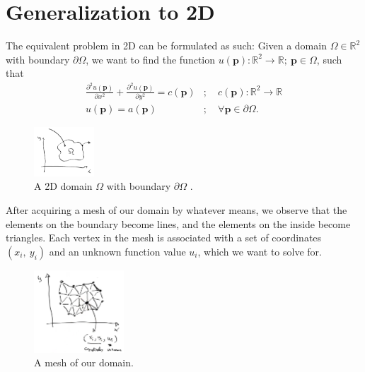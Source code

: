 \documentclass[acmtog]{acmart}
\begin{document}
\section{Generalization to 2D}
The equivalent problem in 2D can be formulated as such:
Given a domain $\Omega \in \mathbb{R}^2$ with boundary $\partial\Omega$, we want to find the function $u(\boldsymbol p) : \mathbb{R}^2 \to \mathbb{R} ; \ \boldsymbol p \in \Omega$, such that
%
\begin{align}
  \frac{ \partial^{2} u(\boldsymbol p) }{ \partial x^{2} } + \frac{ \partial^{2} u(\boldsymbol p) }{ \partial y^{2} }  = c(\boldsymbol p) & ; \quad c(\boldsymbol p): \mathbb{R}^2 \to \mathbb{R} \\
  u(\boldsymbol p) = a(\boldsymbol p)                                                                                                     & ; \quad \forall \boldsymbol p \in \partial \Omega.
\end{align}
%
\begin{figure}[H]
  \centering
  \includegraphics[width=0.2\textwidth]{Images/img_1.png}
  \caption{A 2D domain $\Omega$ with boundary $\partial \Omega$ .}
\end{figure}
%

After acquiring a mesh of our domain by whatever means, we observe that the elements on the boundary become lines, and the elements on the inside become triangles. Each vertex in the mesh is associated with a set of coordinates $(x_i, \ y_i)$ and an unknown function value $u_i$, which we want to solve for.
%
\begin{figure}[H]
  \centering
  \includegraphics[width=0.3\textwidth]{Images/img_2.png}
  \caption{A mesh of our domain.}
\end{figure}
%
\end{document}
